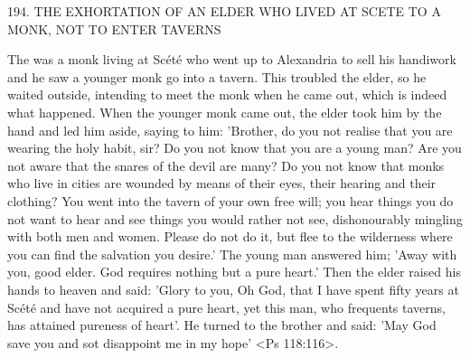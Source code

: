 194. THE EXHORTATION OF AN ELDER
WHO LIVED AT SCETE TO A MONK,
NOT TO ENTER TAVERNS

The was a monk living at Scété who went up to Alexandria to sell
his handiwork and he saw a younger monk go into a tavern. This
troubled the elder, so he waited outside, intending to meet the monk
when he came out, which is indeed what happened. When the
younger monk came out, the elder took him by the hand and led
him aside, saying to him: 'Brother, do you not realise that you are
wearing the holy habit, sir? Do you not know that you are a young
man? Are you not aware that the snares of the devil are many? Do
you not know that monks who live in cities are wounded by means
of their eyes, their hearing and their clothing? You went into the
tavern of your own free will; you hear things you do not want to
hear and see things you would rather not see, dishonourably
mingling with both men and women. Please do not do it, but flee to
the wilderness where you can find the salvation you desire.' The
young man answered him; 'Away with you, good elder. God
requires nothing but a pure heart.' Then the elder raised his hands
to heaven and said: 'Glory to you, Oh God, that I have spent fifty
years at Scété and have not acquired a pure heart, yet this man,
who frequents taverns, has attained pureness of heart'. He turned to
the brother and said: 'May God save you and sot disappoint me in
my hope' <Ps 118:116>.

